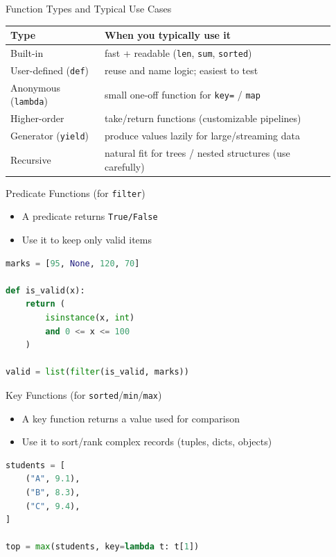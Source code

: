 \documentclass{beamer}
\begin{document}
\begin{frame}[fragile]{Function Types and Typical Use Cases}
  \footnotesize
  \setlength{\tabcolsep}{3pt}
  \begin{tabular}{p{0.27\linewidth}p{0.66\linewidth}}
    \toprule
    Type & When you typically use it \\
    \midrule
    Built-in & fast + readable (\texttt{len}, \texttt{sum}, \texttt{sorted}) \\
    User-defined (\texttt{def}) & reuse and name logic; easiest to test \\
    Anonymous (\texttt{lambda}) & small one-off function for \texttt{key=} / \texttt{map} \\
    Higher-order & take/return functions (customizable pipelines) \\
    Generator (\texttt{yield}) & produce values lazily for large/streaming data \\
    Recursive & natural fit for trees / nested structures (use carefully) \\
    \bottomrule
  \end{tabular}
\end{frame}

\begin{frame}[fragile]{Predicate Functions (for \texttt{filter})}
  \begin{itemize}[<+->]
    \item A predicate returns \texttt{True/False}
    \item Use it to keep only valid items
  \end{itemize}
  \vspace{0.3em}
  \begin{lstlisting}[language=Python]
marks = [95, None, 120, 70]

def is_valid(x):
    return (
        isinstance(x, int)
        and 0 <= x <= 100
    )

valid = list(filter(is_valid, marks))
  \end{lstlisting}
\end{frame}

\begin{frame}[fragile]{Key Functions (for \texttt{sorted}/\texttt{min}/\texttt{max})}
  \begin{itemize}[<+->]
    \item A key function returns a value used for comparison
    \item Use it to sort/rank complex records (tuples, dicts, objects)
  \end{itemize}
  \vspace{0.3em}
  \begin{lstlisting}[language=Python]
students = [
    ("A", 9.1),
    ("B", 8.3),
    ("C", 9.4),
]

top = max(students, key=lambda t: t[1])
  \end{lstlisting}
\end{frame}
\end{document}
